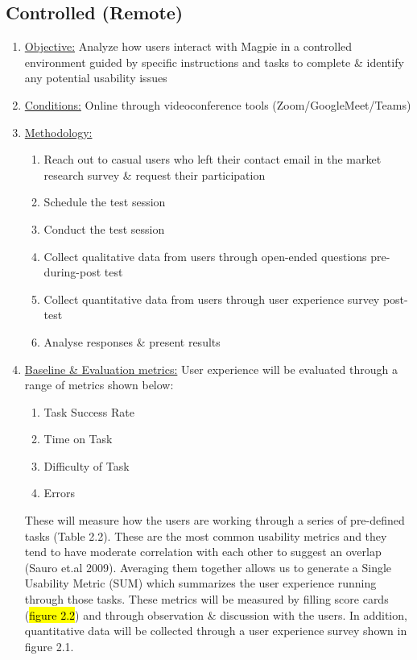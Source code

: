 \documentclass{report}
\begin{document}
\subsection{Controlled (Remote)}
\begin{enumerate}
    \item \underline{Objective:} Analyze how users interact with Magpie in a
          controlled environment guided by specific instructions and tasks to complete
          \& identify any potential usability issues
    \item \underline{Conditions:} Online through videoconference tools
          (Zoom/GoogleMeet/Teams)
    \item \underline{Methodology:}
          \begin{enumerate}
              \item Reach out to casual users who left their contact email in the market research survey \& request their participation
              \item Schedule the test session
              \item Conduct the test session
              \item Collect qualitative data from users through open-ended questions pre-during-post test
              \item Collect quantitative data from users through user experience survey post-test
              \item Analyse responses \& present results
          \end{enumerate}
    \item \underline{Baseline \& Evaluation metrics:} User experience will be evaluated through a range of metrics shown below:
          \begin{enumerate}
              \item Task Success Rate
              \item Time on Task
              \item Difficulty of Task
              \item Errors
          \end{enumerate}
          These will measure how the users are working through a series of pre-defined tasks (Table 2.2). These are the most common usability metrics and they tend to have moderate correlation with each other to suggest an overlap (Sauro et.al 2009).  Averaging them together allows us to generate a Single Usability Metric (SUM) which summarizes the user experience running through those tasks. These metrics will be measured by filling score cards (\hl{figure 2.2}) and through observation \& discussion with the users. In addition, quantitative data will be collected through a user experience survey shown in figure 2.1.
\end{enumerate}
\end{document}
